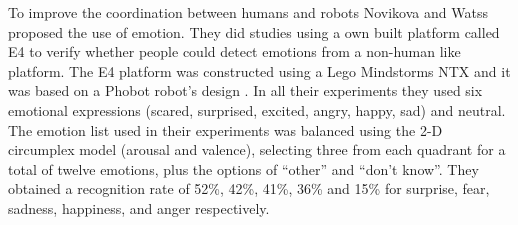 To improve the coordination between humans and robots Novikova and Watss~\cite{Novika2015} proposed the use of emotion. They did studies using a own built platform called E4 to verify whether people could detect emotions from a non-human like platform. The E4 platform was constructed using a Lego Mindstorms NTX and it was based on a Phobot robot's design
. In all their experiments they used six emotional expressions (scared, surprised, excited, angry, happy, sad) and neutral. The emotion list used in their experiments was balanced using the 2-D circumplex model (arousal and valence), selecting three from each quadrant for a total of twelve emotions, plus the options of ``other'' and ``don't know''. They obtained a recognition rate of 52\%, 42\%, 41\%, 36\% and 15\% for surprise, fear, sadness, happiness, and anger respectively.